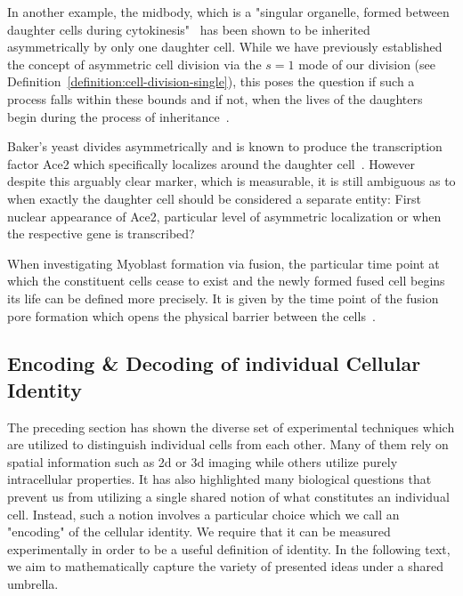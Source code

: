 In another example, the midbody, which is a "singular organelle, formed between daughter cells
during cytokinesis"~\cite{Kuo2011} has been shown to be inherited asymmetrically by only one
daughter cell.
While we have previously established the concept of asymmetric cell division via the $s=1$ mode of
our division (see Definition~\ref{definition:cell-division-single}), this poses the question if such
a process falls within these bounds and if not, when the lives of the daughters begin during the
process of inheritance~\cite{Chen2013}.

Baker's yeast divides asymmetrically and is known to produce the transcription factor Ace2 which
specifically localizes around the daughter cell~\cite{ColmanLerner2001}.
However despite this arguably clear marker, which is measurable, it is still ambiguous as to when
exactly the daughter cell should be considered a separate entity: First nuclear appearance of Ace2,
particular level of asymmetric localization or when the respective gene is transcribed?

When investigating Myoblast formation via fusion, the particular time point at which the constituent
cells cease to exist and the newly formed fused cell begins its life can be defined more precisely.
It is given by the time point of the fusion pore formation which opens the physical barrier between
the cells~\cite{Sens2010,Kim2015}.

\subsection{Encoding \& Decoding of individual Cellular Identity}
The preceding section has shown the diverse set of experimental techniques which are utilized to
distinguish individual cells from each other.
Many of them rely on spatial information such as \ac{2d} or \ac{3d} imaging while others utilize
purely intracellular properties.
It has also highlighted many biological questions that prevent us from utilizing a single shared
notion of what constitutes an individual cell.
Instead, such a notion involves a particular choice which we call an "encoding" of the cellular
identity.
We require that it can be measured experimentally in order to be a useful definition of identity.
In the following text, we aim to mathematically capture the variety of presented ideas under a
shared umbrella.

